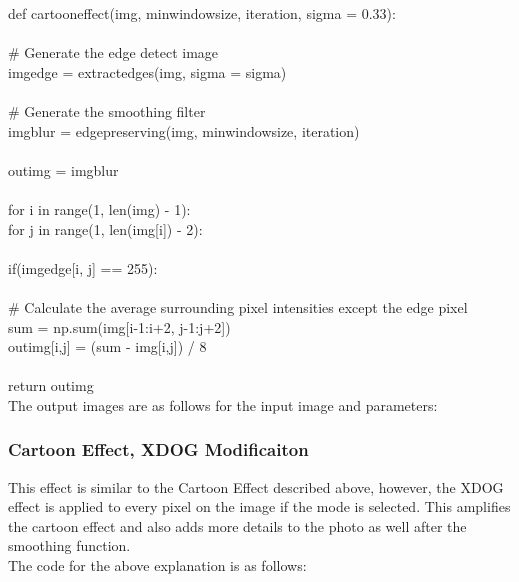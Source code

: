 \documentclass{article}
\begin{document}
	\noindent def cartoon\textunderscore effect(img, min\textunderscore window\textunderscore size, iteration, sigma = 0.33):\\
	\\
	\indent \# Generate the edge detect image\\
	\indent img\textunderscore edge = extract\textunderscore edges(img, sigma = sigma)\\
	\\
	\indent \# Generate the smoothing filter\\
	\indent img\textunderscore blur = edge\textunderscore preserving(img, min\textunderscore window\textunderscore size, iteration)\\
	\\
	\indent out\textunderscore img = img\textunderscore blur\\
	\\
	\indent for i in range(1, len(img) - 1):\\
	\indent \indent for j in range(1, len(img[i]) - 2):\\
	\\
	\indent \indent \indent if(img\textunderscore edge[i, j] == 255):\\
	\\
	\indent \indent \indent \indent \# Calculate the average surrounding pixel intensities except the edge pixel\\
	\indent \indent \indent \indent sum = np.sum(img[i-1:i+2, j-1:j+2])\\
	\indent \indent \indent \indent out\textunderscore img[i,j] = (sum - img[i,j]) / 8\\
	\\
	\indent return out\textunderscore img\\

	The output images are as follows for the input image and parameters:\\
	
	\subsubsection{Cartoon Effect, XDOG Modificaiton}
	
	This effect is similar to the Cartoon Effect described above, however, the XDOG effect is applied to every pixel on the image if the mode is selected. This amplifies the cartoon effect and also adds more details to the photo as well after the smoothing function.\\
	
	The code for the above explanation is as follows:\\
	
\end{document}
